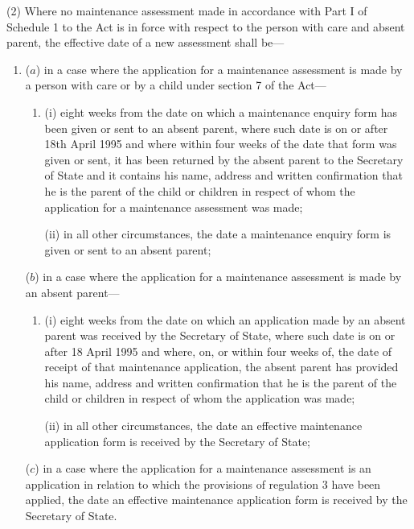 \documentclass[a4paper]{article}
\begin{document}
(2) Where no maintenance assessment made in accordance with Part I of Schedule 1 to the Act is in force with respect to the person with care and absent parent, the effective date of a new assessment shall be—
\begin{enumerate}\item[]
($a$) in a case where the application for a maintenance assessment is made by a person with care or by a child under section 7 of the Act—
\begin{enumerate}\item[]
(i) eight weeks from the date on which a maintenance enquiry form has been given or sent to an absent parent, where such date is on or after 18th April 1995 and where within four weeks of the date that form was given or sent, it has been returned by the absent parent to the Secretary of State and it contains his name, address and written confirmation that he is the parent of the child or children in respect of whom the application for a maintenance assessment was made;

(ii) in all other circumstances, the date a maintenance enquiry form is given or sent to an absent parent;
\end{enumerate}

($b$) in a case where the application for a maintenance assessment is made by an absent parent—
\begin{enumerate}\item[]
(i) eight weeks from the date on which an application made by an absent parent was received by the Secretary of State, where such date is on or after 18 April 1995 and where, on, or within four weeks of, the date of receipt of that maintenance application, the absent parent has provided his name, address and written confirmation that he is the parent of the child or children in respect of whom the application was made;

(ii) in all other circumstances, the date an effective maintenance application form is received by the Secretary of State;
\end{enumerate}

($c$) in a case where the application for a maintenance assessment is an application in relation to which the provisions of regulation 3 have been applied, the date an effective maintenance application form is received by the Secretary of State.
\end{enumerate}
\end{document}
